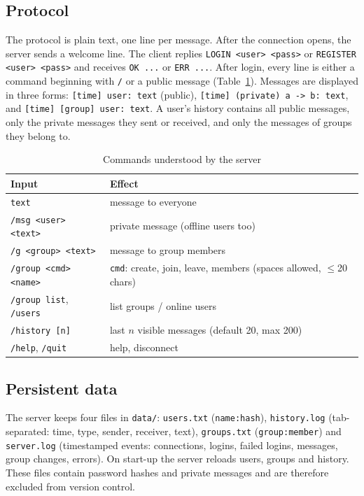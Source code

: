 \documentclass[conference]{IEEEtran}
\newcommand{\code}[1]{\texttt{#1}}
\begin{document}
\subsection{Protocol}
The protocol is plain text, one line per message. After the connection opens, the server sends a welcome line. The client replies
\code{LOGIN <user> <pass>} or \code{REGISTER <user> <pass>} and receives \code{OK ...} or \code{ERR ...}. After login, every line is either a
command beginning with \code{/} or a public message (Table~\ref{tab:cmds}). Messages are displayed in three forms:
\code{[time] user: text} (public), \code{[time] (private) a -> b: text}, and \code{[time] [group] user: text}.
A user's history contains all public messages, only the private messages they sent or received, and only the messages of groups they belong to.

\begin{table}[!t]
\caption{Commands understood by the server}
\label{tab:cmds}
\centering\small
\begin{tabular}{@{}p{}p{}@{}}
\toprule
Input & Effect\\
\midrule
\code{text} & message to everyone\\
\code{/msg <user> <text>} & private message (offline users too)\\
\code{/g <group> <text>} & message to group members\\
\code{/group <cmd> <name>} & \code{cmd}: create, join, leave, members (spaces allowed, $\le$20 chars)\\
\code{/group list}, \code{/users} & list groups / online users\\
\code{/history [n]} & last $n$ visible messages (default 20, max 200)\\
\code{/help}, \code{/quit} & help, disconnect\\
\bottomrule
\end{tabular}
\end{table}

\subsection{Persistent data}
The server keeps four files in \code{data/}: \code{users.txt} (\code{name:hash}), \code{history.log} (tab-separated: time, type, sender, receiver, text),
\code{groups.txt} (\code{group:member}) and \code{server.log} (timestamped events: connections, logins, failed logins, messages, group changes, errors).
On start-up the server reloads users, groups and history. These files contain password hashes and private messages and are therefore excluded from version control.
\end{document}
